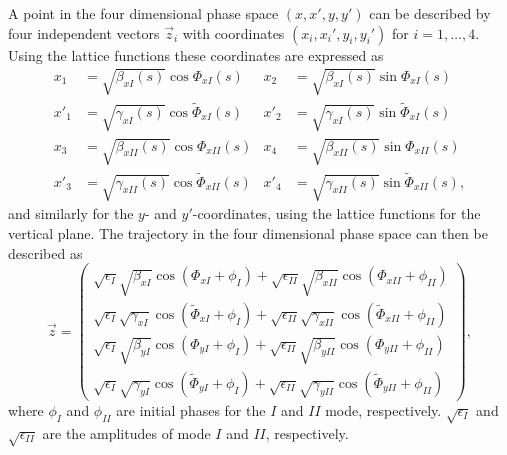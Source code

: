 \documentclass[english]{article}
\begin{document}
A point in the four dimensional phase space $(x,x',y,y')$ can be described by
four independent vectors $\vec{z}_i$ with coordinates $(x_i,x_i',y_i,y_i')$
for $i=1,\ldots,4$.  Using the lattice functions these coordinates are
expressed as
\begin{align}
    x_1 &= \sqrt{\beta_{xI}(s)}\cos\Phi_{xI}(s) & 
    x_2 &= \sqrt{\beta_{xI}(s)}\sin\Phi_{xI}(s) \\
    x'_1 &= \sqrt{\gamma_{xI}(s)}\cos\tilde{\Phi}_{xI}(s) & 
    x'_2 &= \sqrt{\gamma_{xI}(s)}\sin\tilde{\Phi}_{xI}(s) \\
    x_3 &= \sqrt{\beta_{xII}(s)}\cos\Phi_{xII}(s) & 
    x_4 &= \sqrt{\beta_{xII}(s)}\sin\Phi_{xII}(s) \\
    x'_3 &= \sqrt{\gamma_{xII}(s)}\cos\tilde{\Phi}_{xII}(s) & 
    x'_4 &= \sqrt{\gamma_{xII}(s)}\sin\tilde{\Phi}_{xII}(s),
\end{align}
and similarly for the $y$- and $y'$-coordinates, using the lattice functions for the vertical plane.
The trajectory in the four dimensional phase space can then be described as
\begin{equation}
    \vec{z} = \left(
        \begin{array}{l}
            \sqrt{\epsilon_I}\sqrt{\beta_{xI}}\cos(\Phi_{xI}+\phi_I) +
            \sqrt{\epsilon_{II}}\sqrt{\beta_{xII}}\cos(\Phi_{xII}+\phi_{II}) \\
            \sqrt{\epsilon_I}\sqrt{\gamma_{xI}}\cos(\tilde{\Phi}_{xI}+\phi_I) +
            \sqrt{\epsilon_{II}}\sqrt{\gamma_{xII}}\cos(\tilde{\Phi}_{xII}+\phi_{II}) \\ 
            \sqrt{\epsilon_I}\sqrt{\beta_{yI}}\cos(\Phi_{yI}+\phi_I) +
            \sqrt{\epsilon_{II}}\sqrt{\beta_{yII}}\cos(\Phi_{yII}+\phi_{II}) \\
            \sqrt{\epsilon_I}\sqrt{\gamma_{yI}}\cos(\tilde{\Phi}_{yI}+\phi_I) +
            \sqrt{\epsilon_{II}}\sqrt{\gamma_{yII}}\cos(\tilde{\Phi}_{yII}+\phi_{II}) 
        \end{array}
    \right),
\end{equation}
where $\phi_I$ and $\phi_{II}$ are initial phases for the $I$ and $II$ mode,
respectively. $\sqrt{\epsilon_{I}}$ and $\sqrt{\epsilon_{II}}$ are the
amplitudes of mode $I$ and $II$, respectively.
\end{document}
